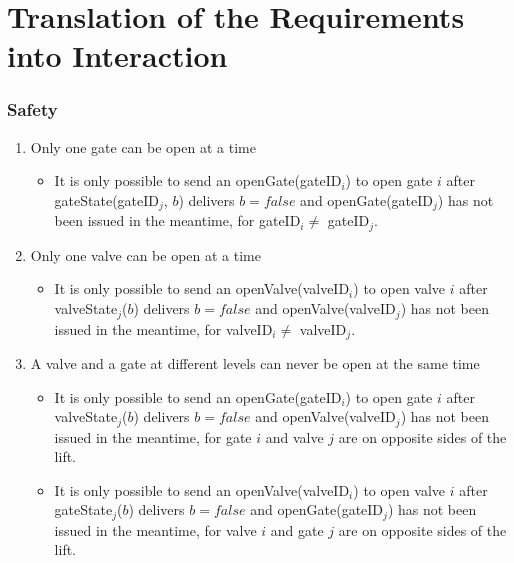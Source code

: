\section{Translation of the Requirements into Interaction}
\subsubsection*{Safety}
\begin{enumerate}
	\item Only one gate can be open at a time
		\begin{itemize}
			\item It is only possible to send an openGate(gateID$_i$) to open gate $i$ after gateState(gateID$_j$, $ b $) delivers $b = false$ and openGate(gateID$_j$) has not been issued in the meantime, for gateID$_i \neq$ gateID$_j$.
		\end{itemize}
	
	\item Only one valve can be open at a time
		\begin{itemize}
			\item It is only possible to send an openValve(valveID$_i$) to open valve $i$ after \linebreak valveState$_j$($ b $) delivers $b = false$ and openValve(valveID$_j$) has not been issued in the meantime, for valveID$_i \neq$ valveID$_j$.
		\end{itemize}
	
	\item A valve and a gate at different levels can never be open at the same time
		\begin{itemize}
			\item It is only possible to send an openGate(gateID$_i$) to open gate $i$ after valveState$_j$($ b $) delivers $b = false$ and openValve(valveID$_j$) has not been issued in the meantime, for gate $i$ and valve $j$ are on opposite sides of the lift.
			\item It is only possible to send an openValve(valveID$_i$) to open valve $i$ after gateState$_j$($ b $) delivers $b = false$ and openGate(gateID$_j$) has not been issued in the meantime, for valve $i$ and gate $j$ are on opposite sides of the lift.
		\end{itemize}
	
	

\end{enumerate}
